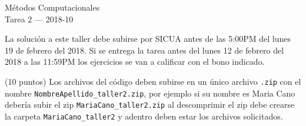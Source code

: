 \documentclass[11pt,letterpaper]{exam}
\begin{document}
\begin{center}
{\Large Métodos Computacionales} \\
Tarea 2 --- 2018-10\\

\end{center}


\vspace{0.3cm}

\noindent
La solución a este taller debe subirse por SICUA antes de las 5:00PM
del lunes 19 de febrero del 2018. 
Si se entrega la tarea antes del lunes 12 de febrero del 2018 a las
11:59PM los ejercicios se van a calificar con el bono indicado. 
\noindent

\vspace{0.3cm}
(10 puntos) Los archivos del c\'odigo  deben subirse en un
\'unico archivo \verb".zip" con el nombre
\verb"NombreApellido_taller2.zip", por ejemplo si su nombre es Maria
Cano deber\'ia subir el zip
\verb"MariaCano_taller2.zip" al descomprimir el zip debe crearse la
carpeta \verb"MariaCano_taller2" y adentro deben estar los archivos
solicitados. 
\end{document}
